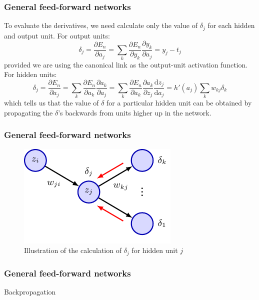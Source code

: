\documentclass{beamer}
\begin{document}
\begin{frame}
    \frametitle{General feed-forward networks}
    To evaluate the derivatives, we need calculate only the value of $\delta_{j}$ for each hidden and output unit. For output units:
    \begin{equation*}
        \delta_{j}=\frac{\partial{}E_{n}}{\partial{}a_{j}}=\sum_{k}\frac{\partial{}E_{n}}{\partial{}y_{k}}\frac{\partial{}y_{k}}{\partial{}a_{j}}=y_{j}-t_{j}
    \end{equation*}
    provided we are using the canonical link as the output-unit activation function. For hidden units:
    \begin{equation*}
        \delta_{j}=\frac{\partial{}E_{n}}{\partial{}a_{j}}=\sum_{k}\frac{\partial{}E_{n}}{\partial{}a_{k}}\frac{\partial{}a_{k}}{\partial{}a_{j}}=\sum_{k}\frac{\partial{}E_{n}}{\partial{}a_{k}}\frac{\partial{}a_{k}}{\partial{}z_{j}}\frac{\mathrm{d}z_{j}}{\mathrm{d}a_{j}}=h'(a_{j})\sum_{k}w_{kj}\delta_{k}
    \end{equation*}
    which tells us that the value of $\delta$ for a particular hidden unit can be obtained by propagating the $\delta$'s backwards from units higher up in the network.
\end{frame}

\begin{frame}
    \frametitle{General feed-forward networks}
    \begin{figure}
        \caption{Illustration of the calculation of $\delta_{j}$ for hidden unit $j$}
        \includegraphics{Figure_1.pdf}
    \end{figure}
\end{frame}

\begin{frame}
    \frametitle{General feed-forward networks}
    \begin{algorithm}[H]
        \caption{Backpropagation}
        \;
    \end{algorithm}
\end{frame}
\end{document}
